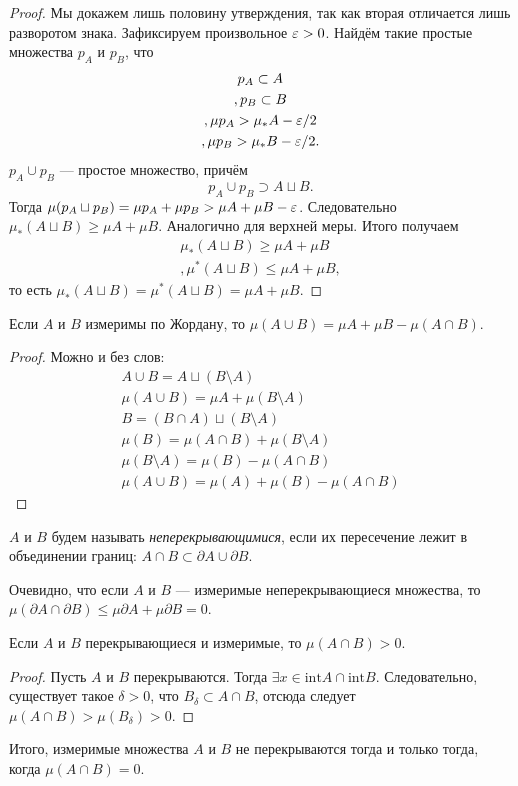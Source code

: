 \begin{proof}
Мы докажем лишь половину утверждения, так как вторая отличается лишь разворотом знака. Зафиксируем произвольное $\varepsilon > 0$. Найдём такие простые множества $p_A$ и $p_B$, что
\begin{gather}
    p_A \subset A\\,
    p_B \subset B\\,
    \mu p_A > \mu_*A - \varepsilon/2\\,
    \mu p_B > \mu_*B - \varepsilon/2.
\end{gather}
$p_A \cup p_B$ --- простое множество, причём
$$
    p_A \cup p_B \supset A \sqcup B.
$$
Тогда $\mu(p_A \sqcup p_B) = \mu p_A + \mu p_B > \mu A + \mu B - \varepsilon$. Следовательно $\mu_*(A \sqcup B)\geqslant \mu A + \mu B$. Аналогично для верхней меры. Итого получаем
\begin{gather}
    \mu_*(A \sqcup B)\geqslant \mu A + \mu B\\,
    \mu^*(A \sqcup B)\leqslant \mu A + \mu B,
\end{gather}
то есть $\mu_*(A \sqcup B) = \mu^*(A \sqcup B) = \mu A + \mu B.$
\end{proof}
\begin{Consequence}
    Если $A$ и $B$ измеримы по Жордану, то $\mu (A \cup B) = \mu A + \mu B - \mu(A \cap B)$.
\end{Consequence}
\begin{proof}
Можно и без слов:
\begin{gather}    
    A \cup B = A \sqcup (B\setminus A)\\
    \mu (A \cup B) = \mu A + \mu(B \setminus A)\\
    B = (B \cap A) \sqcup (B \setminus A)\\
    \mu(B) = \mu(A \cap B) + \mu(B \setminus A)\\
    \mu(B \setminus A) = \mu(B) - \mu(A \cap B)\\
    \mu(A \cup B) = \mu(A) + \mu(B) - \mu(A \cap B)
\end{gather}
\end{proof}
\begin{Def}
    $A$ и $B$ будем называть \textit{неперекрывающимися}, если их пересечение лежит в объединении границ: $A\cap B \subset \partial A \cup \partial B$.
\end{Def}
\begin{Comment}
Очевидно, что если $A$ и $B$ --- измеримые неперекрывающиеся множества, то $\mu(\partial A \cap \partial B) \leq \mu \partial A +\mu \partial B = 0$.    
\end{Comment}
\begin{Statement}
    Если $A$ и $B$ перекрывающиеся и измеримые, то $\mu(A \cap B) > 0$.
\end{Statement}
\begin{proof}
    Пусть $A$ и $B$ перекрываются. Тогда $\exists x \in \mathrm{int} A \cap \mathrm{int}B$. Следовательно, существует такое $\delta > 0$, что $B_\delta \subset A \cap B$, отсюда следует $\mu(A \cap B) > \mu(B_\delta) > 0$. 

\end{proof}
Итого, измеримые множества $A$ и $B$ не перекрываются тогда и только тогда, когда $\mu(A \cap B) = 0.$